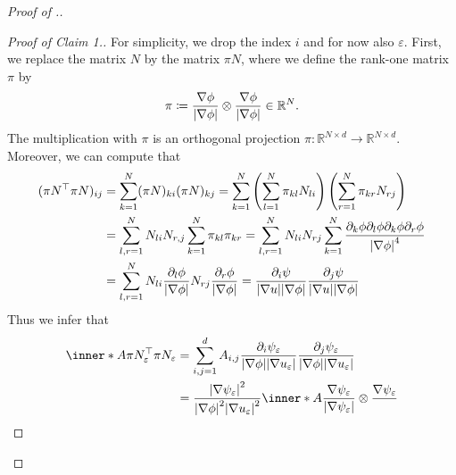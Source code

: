 \begin{proof}[Proof of .]
	\begin{proof}[Proof of Claim 1.]
		For simplicity, we drop the index $ i $ and for now also $ \varepsilon 
		$.
		First, we replace the matrix $ N $ by the matrix $ \pi N $, where we 
		define the rank-one matrix $ \pi $ by
		\begin{equation*}
			\pi 
			\coloneqq
			\frac{ \nabla \phi }{ \abs{ \nabla \phi } }
			\otimes
			\frac{ \nabla \phi }{ \abs{ \nabla \phi } }
			\in 
			\mathbb{ R }^{ N }.
		\end{equation*}
		The multiplication with $ \pi $ is an orthogonal projection $ \pi 
		\colon \mathbb{ R }^{ N \times d } \to \mathbb{ R }^{ N \times d } $. 
		Moreover, we can compute that
		\begin{align*}
			( \pi N^{ \top } \pi N )_{ i j }
			& =
			\sum_{ k = 1 }^{ N }
			( \pi N )_{ k i }
			( \pi N )_{ k j }
			=
			\sum_{ k = 1 }^{ N }
			\left(
			\sum_{ l = 1 }^{ N }
			\pi_{ k l } N_{ l i }
			\right)
			\left(
			\sum_{ r = 1 }^{ N }
			\pi_{ k r } N_{ r j }
			\right)
			\\
			& =
			\sum_{ l, r = 1 }^{ N }
			N_{ l i } N_{ r , j }
			\sum_{ k = 1 }^{ N }
			\pi_{ k l }
			\pi_{ k r }
			=
			\sum_{ l, r = 1 }^{ N }
			N_{ l i }N_{ r j }
			\sum_{ k = 1 }^{ N }
			\frac{ \partial_{ k } \phi  \partial_{ l } \phi \partial_{ 
					k } \phi \partial_{ r } \phi }{ \abs{ \nabla \phi 
				}^{ 4 } }
			\\
			& =
			\sum_{ l, r = 1 }^{ N }
			N_{ l i } \frac{ \partial_{ l } \phi }{ \abs{ \nabla
					\phi } }
			N_{ r j } \frac{ \partial_{ r } \phi }{ \abs{ \nabla 
					\phi } }
			=
			\frac{ \partial_{ i } \psi }{ \abs{ \nabla u } \abs{ \nabla
					\phi } }
			\frac{ \partial_{ j } \psi }{ \abs{ \nabla u } \abs{ \nabla 
					\phi } }
		\end{align*}
		Thus we infer that
		\begin{align*}
			\inner*{ A }{ \pi N_{ \varepsilon }^{ \top } \pi N_{ \varepsilon } }
			& =
			\sum_{ i, j = 1 }^{ d }
			A_{ i , j } 
			\frac{ \partial_{ i } \psi_{ \varepsilon } }{ \abs{ \nabla \phi 
				} \abs{ \nabla u_{ \varepsilon } } }
			\frac{ \partial_{ j } \psi_{ \varepsilon } }{ \abs{ \nabla \phi 
				} \abs{ \nabla u_{ \varepsilon } } }
			\\
			& =
			\frac{ \abs{ \nabla \psi_{ \varepsilon } }^{ 2 } }{ \abs{ \nabla 
					\phi }^{ 2 } \abs{ \nabla u_{ \varepsilon } }^{ 2 } }
			\inner*{ A }
			{ \frac{ \nabla \psi_{ \varepsilon } }{ \abs{ \nabla \psi_{ 
							\varepsilon } } } \otimes \frac{ \nabla \psi_{ 
							\varepsilon } }{ 
}}
\end{align*}
\end{proof}
\end{proof}
